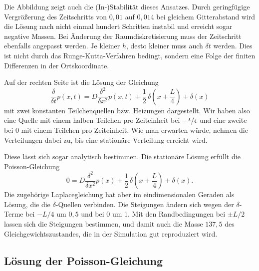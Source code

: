 Die Abbildung zeigt auch die (In-)Stabilität dieses Ansatzes. Durch
geringfügige Vergrößerung des Zeitschritts von $0,01$ auf $0,014$ bei
gleichem Gitterabstand wird die Lösung nach nicht einmal hundert
Schritten instabil und erreicht sogar negative Massen. Bei Änderung
der Raumdiskretisierung muss der Zeitschritt ebenfalls angepasst
werden. Je kleiner $h$, desto kleiner muss auch $\delta t$
werden. Dies ist nicht durch das Runge-Kutta-Verfahren bedingt,
sondern eine Folge der finiten Differenzen in der Ortskoordinate.

Auf der rechten Seite ist die Lösung der Gleichung
\begin{equation}
  \frac{\delta}{\delta t} p(x, t) =
  D\frac{\delta^2}{\delta x^2} p(x, t)
  + \frac{1}{2}\,\delta\left(x+\frac{L}{4}\right) + \delta(x)
\end{equation}
mit zwei konstanten Teilchenquellen bzw. Heizungen dargestellt. Wir
haben also eine Quelle mit einem halben Teilchen pro Zeiteinheit bei
$-\nicefrac{L}{4}$ und eine zweite bei $0$ mit einem Teilchen pro
Zeiteinheit. Wie man erwarten würde, nehmen die Verteilungen dabei zu,
bis eine stationäre Verteilung erreicht wird.

Diese lässt sich sogar analytisch bestimmen. Die stationäre Lösung
erfüllt die Poisson-Gleichung
\begin{equation}
  0 = D\frac{\delta^2}{\delta x^2} p(x) +
  \frac{1}{2}\,\delta\left(x+\frac{L}{4}\right) + \delta(x).
\end{equation}
Die zugehörige Laplacegleichung hat aber im eindimensionalen Geraden
als Lösung, die die $\delta$-Quellen verbinden. Die Steigungen ändern
sich wegen der $\delta$-Terme bei $-L/4$ um $0,5$ und bei 0 um 1. Mit
den Randbedingungen bei $\pm L/2$ lassen sich die Steigungen
bestimmen, und damit auch die Masse $137,5$ des
Gleichgewichtszustandes, die in der Simulation gut reproduziert wird.

\subsection{Lösung der Poisson-Gleichung}

